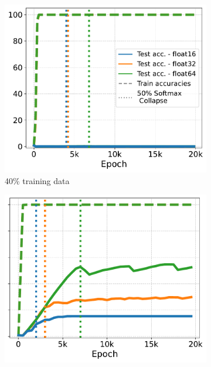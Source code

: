 \begin{figure}[t]
\centering
\begin{subfigure}{.32\textwidth}
  \centering
  \includegraphics[width=\linewidth]{grokking_iclr_arxiv/figures/float32vsfloat64_40_percent_with_legend.pdf}
  \caption{40\% training data}
  \label{fig:grokking_stops_40}
\end{subfigure}
\hfill
\begin{subfigure}{.32\textwidth}
  \centering
  \includegraphics[width=\linewidth]{grokking_iclr_arxiv/figures/float32vsfloat64_60_percent.pdf}

\end{subfigure}
\end{figure}

